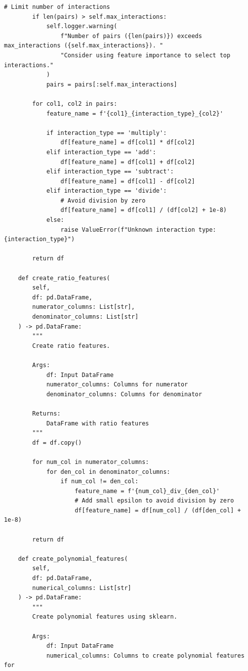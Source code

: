 \begin{lstlisting}[style=python, caption={Intelligent Feature Interaction Generation}]
        # Limit number of interactions
        if len(pairs) > self.max_interactions:
            self.logger.warning(
                f"Number of pairs ({len(pairs)}) exceeds max_interactions ({self.max_interactions}). "
                "Consider using feature importance to select top interactions."
            )
            pairs = pairs[:self.max_interactions]

        for col1, col2 in pairs:
            feature_name = f'{col1}_{interaction_type}_{col2}'

            if interaction_type == 'multiply':
                df[feature_name] = df[col1] * df[col2]
            elif interaction_type == 'add':
                df[feature_name] = df[col1] + df[col2]
            elif interaction_type == 'subtract':
                df[feature_name] = df[col1] - df[col2]
            elif interaction_type == 'divide':
                # Avoid division by zero
                df[feature_name] = df[col1] / (df[col2] + 1e-8)
            else:
                raise ValueError(f"Unknown interaction type: {interaction_type}")

        return df

    def create_ratio_features(
        self,
        df: pd.DataFrame,
        numerator_columns: List[str],
        denominator_columns: List[str]
    ) -> pd.DataFrame:
        """
        Create ratio features.

        Args:
            df: Input DataFrame
            numerator_columns: Columns for numerator
            denominator_columns: Columns for denominator

        Returns:
            DataFrame with ratio features
        """
        df = df.copy()

        for num_col in numerator_columns:
            for den_col in denominator_columns:
                if num_col != den_col:
                    feature_name = f'{num_col}_div_{den_col}'
                    # Add small epsilon to avoid division by zero
                    df[feature_name] = df[num_col] / (df[den_col] + 1e-8)

        return df

    def create_polynomial_features(
        self,
        df: pd.DataFrame,
        numerical_columns: List[str]
    ) -> pd.DataFrame:
        """
        Create polynomial features using sklearn.

        Args:
            df: Input DataFrame
            numerical_columns: Columns to create polynomial features for


\end{lstlisting}
